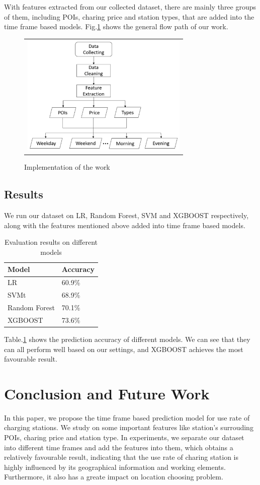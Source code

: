 \documentclass[conference]{IEEEtran}
\begin{document}
With features extracted from our collected dataset, there are mainly three groups of them, including POIs, charing price and station types, that are added into the time frame based models. Fig.\ref{fig3} shows the general flow path of our work.

\begin{figure}[htbp]
	\begin{tabular}{c}
		\includegraphics[width=80mm]{path.pdf}
	\end{tabular}
	\centering
	\caption{Implementation of the work}
	\label{fig3}
\end{figure}

\subsection{Results}
We run our dataset on LR, Random Forest, SVM and XGBOOST respectively, along with the features mentioned above added into time frame based models.
\begin{table}[htbp]
	\caption{Evaluation results on different models}
	\begin{center}
		\begin{tabular}{|l|l|}
			\hline
			Model & Accuracy\\
			\hline
			LR & 60.9\%\\
			\hline
			SVMt & 68.9\%\\
			\hline
			Random Forest & 70.1\%\\
			\hline
			XGBOOST & 73.6\%\\
			\hline
		\end{tabular}
		\label{tab2}
	\end{center}
\end{table}
Table.\ref{tab2} shows the prediction accuracy of different models. We can see that they can all perform well based on our settings, and XGBOOST achieves the most favourable result.

\section{Conclusion and Future Work}
In this paper, we propose the time frame based prediction model for use rate of charging stations. We study on some important features like station's surrouding POIs, charing price and station type. In experiments, we separate our dataset into different time frames and add the features into them, which obtains a relatively favourable result, indicating that the use rate of charing station is highly influenced by its geographical information and working elements. Furthermore, it also has a greate impact on location choosing problem.
\end{document}
